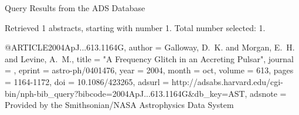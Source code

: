 Query Results from the ADS Database


Retrieved 1 abstracts, starting with number 1.  Total number selected: 1.

@ARTICLE{2004ApJ...613.1164G,
   author = {{Galloway}, D.~K. and {Morgan}, E.~H. and {Levine}, A.~M.},
    title = "{A Frequency Glitch in an Accreting Pulsar}",
  journal = {\apj},
   eprint = {astro-ph/0401476},
     year = 2004,
    month = oct,
   volume = 613,
    pages = {1164-1172},
      doi = {10.1086/423265},
   adsurl = {http://adsabs.harvard.edu/cgi-bin/nph-bib_query?bibcode=2004ApJ...613.1164G&db_key=AST},
  adsnote = {Provided by the Smithsonian/NASA Astrophysics Data System}
}


